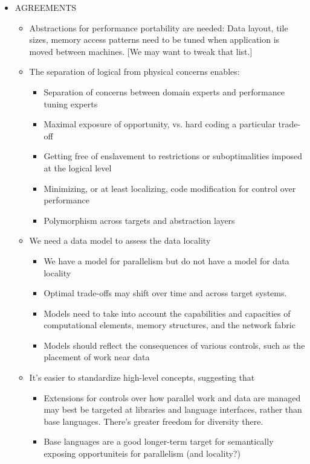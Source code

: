 \begin{itemize}
\item AGREEMENTS
  \begin{itemize}
  \item Abstractions for performance portability are needed: Data layout, tile sizes, memory access patterns need to be tuned when application is moved between machines. [We may want to tweak that list.]
  \item The separation of logical from physical concerns enables:
    \begin{itemize}
    \item Separation of concerns between domain experts and performance tuning experts
    \item Maximal exposure of opportunity, vs. hard coding a particular trade-off
    \item Getting free of enslavement to restrictions or suboptimalities imposed at the logical level
    \item Minimizing, or at least localizing, code modification for control over performance
    \item Polymorphism across targets and abstraction layers
    \end{itemize}
  \item We need a data model to assess the data locality
    \begin{itemize}
    \item We have a model for parallelism but do not have a model for data locality
    \item Optimal trade-offs may shift over time and across target systems.  
    \item Models need to take into account the capabilities and capacities of computational elements, memory structures, and the network fabric 
    \item Models should reflect the consequences of various controls, such as the placement of work near data
    \end{itemize}
  \item It's easier to standardize high-level concepts, suggesting that
    \begin{itemize}
    \item Extensions for controls over how parallel work and data are managed may best be targeted at libraries and language interfaces, rather than base languages.  There's greater freedom for diversity there.
    \item Base languages are a good longer-term target for semantically exposing opportuniteis for parallelism (and locality?)
    \end{itemize}

\end{itemize}
\end{itemize}

